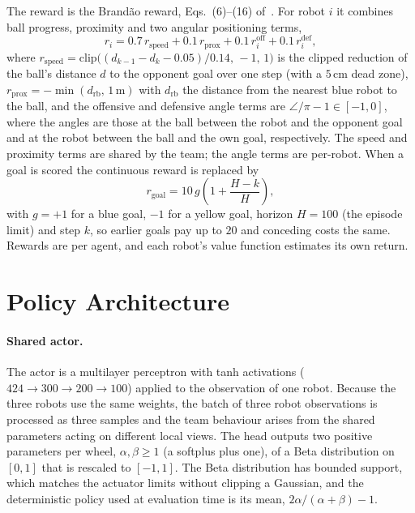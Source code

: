 The reward is the Brand\~ao reward, Eqs.~(6)--(16) of~\cite{brandao2022}.  For robot $i$
it combines ball progress, proximity and two angular positioning terms,
\begin{equation}
    r_i = 0.7\,r_{\mathrm{speed}} + 0.1\,r_{\mathrm{prox}} + 0.1\,r^{\mathrm{off}}_i + 0.1\,r^{\mathrm{def}}_i ,
\end{equation}
where $r_{\mathrm{speed}} = \mathrm{clip}\big((d_{k-1}-d_k-0.05)/0.14,\,-1,\,1\big)$ is the
clipped reduction of the ball's distance $d$ to the opponent goal over one step (with a
$5$\,cm dead zone), $r_{\mathrm{prox}} = -\min(d_{\mathrm{rb}},\,1\,\mathrm{m})$ with $d_{\mathrm{rb}}$ the distance from the nearest blue robot to the ball, and the offensive and defensive angle terms
are $\angle/\pi - 1\in[-1,0]$, where the angles are those at the ball between the robot and the
opponent goal and at the robot between the ball and the own goal, respectively.  The speed and
proximity terms are shared by the team; the angle terms are per-robot.  When a goal is scored the
continuous reward is replaced by
\begin{equation}
    r_{\text{goal}} = 10\,g\left(1 + \frac{H - k}{H}\right),
\end{equation}
with $g=+1$ for a blue goal, $-1$ for a yellow goal, horizon $H = 100$ (the episode limit) and step $k$, so earlier goals pay up to
$20$ and conceding costs the same.  Rewards are per agent, and each robot's value function estimates its own return.

\section{Policy Architecture}
\label{sec:policy}

\paragraph{Shared actor.}
The actor is a multilayer perceptron with tanh activations ($424\to300\to200\to100$) applied to the
observation of one robot.  Because the three robots use the same weights, the batch of three robot
observations is processed as three samples and the team behaviour arises from the
shared parameters acting on different local views.  The head outputs two positive parameters per wheel,
$\alpha,\beta\ge 1$ (a softplus plus one), of a Beta distribution on $[0,1]$ that is rescaled to $[-1,1]$.  The Beta
distribution has bounded support, which matches the actuator limits without clipping a Gaussian, and
the deterministic policy used at evaluation time is its mean, $2\alpha/(\alpha+\beta)-1$.

